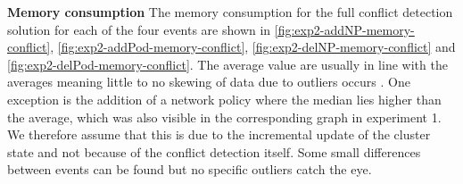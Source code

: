 \textbf{Memory consumption}
\newline The memory consumption for the full conflict detection solution for each of the four events are shown in \autoref{fig:exp2-addNP-memory-conflict}, \autoref{fig:exp2-addPod-memory-conflict}, \autoref{fig:exp2-delNP-memory-conflict} and \autoref{fig:exp2-delPod-memory-conflict}. The average value are usually in line with the averages meaning little to no skewing of data due to outliers occurs . One exception is the addition of a network policy where the median lies higher than the average, which was also visible in the corresponding graph in experiment 1. We therefore assume that this is due to the incremental update of the cluster state and not because of the conflict detection itself. Some small differences between events can be found but no specific outliers catch the eye.


